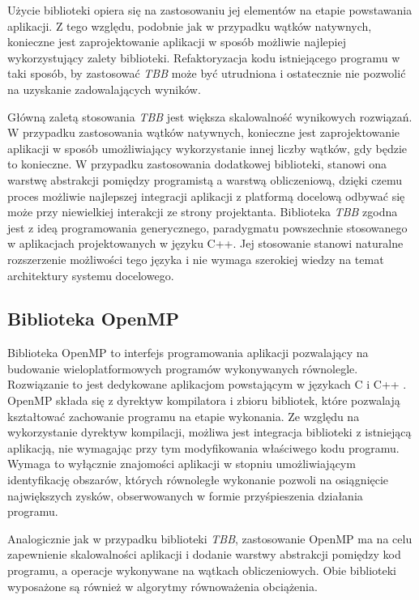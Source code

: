 Użycie biblioteki opiera się na zastosowaniu jej elementów na etapie powstawania aplikacji. 
Z tego względu, podobnie jak w przypadku wątków natywnych, konieczne jest zaprojektowanie aplikacji w sposób możliwie najlepiej wykorzystujący zalety biblioteki. 
Refaktoryzacja kodu istniejącego programu w taki sposób, by zastosować \emph{TBB} może być utrudniona i ostatecznie nie pozwolić na uzyskanie zadowalających wyników.


Główną zaletą stosowania \emph{TBB} jest większa skalowalność wynikowych rozwiązań. 
W przypadku zastosowania wątków natywnych, konieczne jest zaprojektowanie aplikacji w sposób umożliwiający wykorzystanie innej liczby wątków, gdy będzie to konieczne. 
W przypadku zastosowania dodatkowej biblioteki, stanowi ona warstwę abstrakcji pomiędzy programistą a warstwą obliczeniową, dzięki czemu proces możliwie najlepszej integracji aplikacji z platformą docelową odbywać się może przy niewielkiej interakcji ze strony projektanta.
Biblioteka \emph{TBB} zgodna jest z ideą programowania generycznego, paradygmatu powszechnie stosowanego w aplikacjach projektowanych w języku C++.
Jej stosowanie stanowi naturalne rozszerzenie możliwości tego języka i nie wymaga szerokiej wiedzy na temat architektury systemu docelowego.

\subsection{Biblioteka OpenMP}

Biblioteka OpenMP to interfejs programowania aplikacji pozwalający na budowanie wieloplatformowych programów wykonywanych równolegle. 
Rozwiązanie to jest dedykowane aplikacjom powstającym w językach C i C++ \cite{openmp-guide}.
OpenMP składa się z dyrektyw kompilatora i zbioru bibliotek, które pozwalają kształtować zachowanie programu na etapie wykonania. 
Ze względu na wykorzystanie dyrektyw kompilacji, możliwa jest integracja biblioteki z istniejącą aplikacją, nie wymagając przy tym modyfikowania właściwego kodu programu. 
Wymaga to wyłącznie znajomości aplikacji w stopniu umożliwiającym identyfikację obszarów, których równoległe wykonanie pozwoli na osiągnięcie największych zysków, obserwowanych w formie przyśpieszenia działania programu. 

Analogicznie jak w przypadku biblioteki \emph{TBB}, zastosowanie OpenMP ma na celu zapewnienie skalowalności aplikacji i dodanie warstwy abstrakcji pomiędzy kod programu, a operacje wykonywane na wątkach obliczeniowych. 
Obie biblioteki wyposażone są również w algorytmy równoważenia obciążenia.

